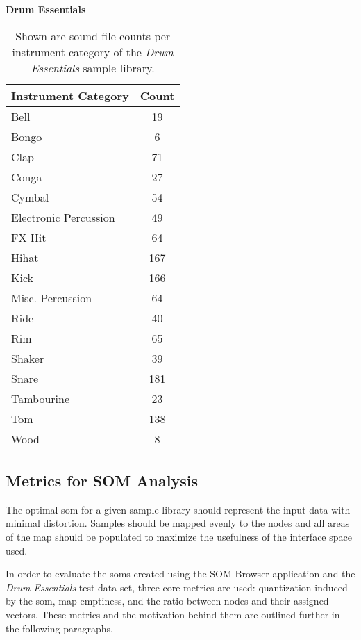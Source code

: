 \begin{table}[!ht]
  \renewcommand{\arraystretch}{1.2}
  \centering
  \textbf{Drum Essentials} \\ [3mm]
  \footnotesize
  \begin{tabular}{ l c }
    \hline
    \textbf{Instrument Category} & \textbf{Count} \\
    \hline
    Bell & 19 \\
    Bongo & 6 \\
    Clap & 71 \\
    Conga & 27 \\
    Cymbal & 54 \\
    Electronic Percussion & 49 \\
    FX Hit & 64 \\
    Hihat & 167 \\
    Kick & 166 \\
    Misc. Percussion & 64 \\
    Ride & 40 \\
    Rim & 65 \\
    Shaker & 39 \\
    Snare & 181 \\
    Tambourine & 23 \\
    Tom & 138 \\
    Wood & 8 \\
  \end{tabular}
  \caption[\textit{Drum Essentials}: Instrument category counts]
  {Shown are sound file counts per instrument category of the
  \textit{Drum Essentials} sample library.}
  \label{table:drum_essentials_counts}
\end{table}

\subsection{Metrics for SOM Analysis}
\label{subsec:eval_som_metrics}
The optimal \gls{som} for a given sample library should represent the input data
with minimal distortion. Samples should be mapped evenly to the nodes and all
areas of the map should be populated to maximize the usefulness of the
interface space used.

\smallskip

In order to evaluate the \glspl{som} created using the SOM Browser application
and the \textit{Drum Essentials} test data set, three core metrics are used:
quantization induced by the \gls{som}, map emptiness, and the ratio between
nodes and their assigned vectors. These metrics and the motivation behind them
are outlined further in the following paragraphs.

